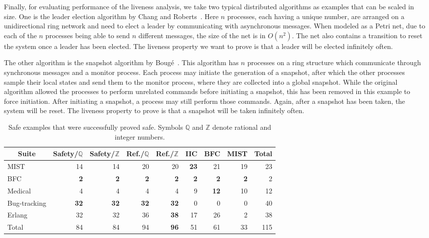 Finally, for evaluating performance of the liveness analysis, we take two
typical distributed algorithms as examples that can be scaled in size.
One is the leader election algorithm by Chang and Roberts~\cite{ChangRoberts79}.
Here $n$ processes, each having a unique number, are arranged on a unidirectional
ring network and need to elect a leader by communicating with asynchronous messages.
When modeled as a Petri net, due to each of the $n$ processes being able to send
$n$ different messages, the size of the net is in $O(n^2)$. The net also contains
a transition to reset the system once a leader has been elected.
The liveness property we want to prove is that a leader will be elected infinitely
often.

The other algorithm is the snapshot algorithm by Bougé~\cite{Bouge87}.
This algorithm has $n$ processes on a ring structure which communicate
through synchronous messages and a monitor process.
Each process may initiate the generation of a snapshot, after which
the other processes sample their local states and send them to
the monitor process, where they are collected into a global snapshot.
While the original algorithm allowed the processes to perform unrelated
commands before initiating a snapshot, this has been removed in this
example to force initiation.
After initiating a snapshot, a process may still perform those commands.
Again, after a snapshot has been taken, the system will be reset.
The liveness property to prove is that a snapshot will be taken infinitely often.

\begin{table}[t]
  \centering
  \caption[Safe examples that were successfully proved safe.]
    {Safe examples that were successfully proved safe. Symbols
     $\mathbb{Q}$ and $\mathbb{Z}$ denote rational and integer numbers.}
\label{table:rate-of-success}
  \begin{tabular}{lrrrrrrrr}
    \toprule
    \multicolumn{1}{c}{Suite} &
    \multicolumn{1}{c}{Safety/$\mathbb{Q}$} &
    \multicolumn{1}{c}{Safety/$\mathbb{Z}$} &
    \multicolumn{1}{c}{Ref./$\mathbb{Q}$} &
    \multicolumn{1}{c}{Ref./$\mathbb{Z}$} &
    \multicolumn{1}{c}{IIC} &
    \multicolumn{1}{c}{BFC} &
    \multicolumn{1}{c}{MIST} &
    \multicolumn{1}{c}{Total} \\
    \midrule
    MIST         & 14 & 14& 20 & 20 & \textbf{23} & 21 & 19 & 23 \\
    BFC          & \textbf{2} & \textbf{2} & \textbf{2} & \textbf{2} & \textbf{2} & \textbf{2} & \textbf{2} & 2 \\
    Medical      & 4 & 4 & 4 & 4 & 9 & \textbf{12} & 10 & 12 \\
    Bug-tracking & \textbf{32} & \textbf{32} & \textbf{32} & \textbf{32} & 0 & 0 & 0 & 40 \\
    Erlang       & 32 & 32 & 36 & \textbf{38} & 17 & 26 & 2 & 38 \\
    \midrule
    Total        & 84 & 84 & 94 & \textbf{96} & 51 & 61 & 33 & 115 \\
    \bottomrule
  \end{tabular}
\end{table}

